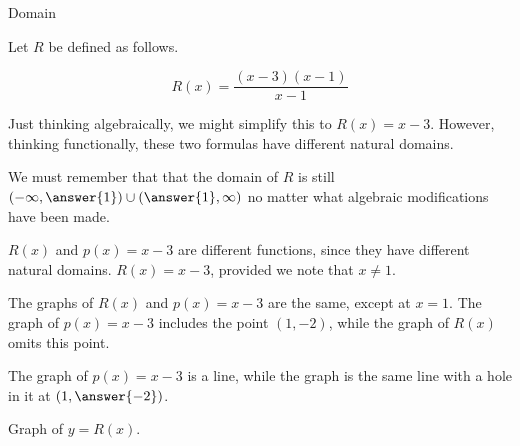 \documentclass{ximera}
\begin{document}
\begin{example} Domain

Let $R$ be defined as follows.


\[   R(x) = \frac{(x-3)(x-1)}{x-1}            \]


Just thinking algebraically, we might simplify this to $R(x) = x-3$. However, thinking functionally, these two formulas have different natural domains.


We must remember that that the domain of $R$ is still $\left( -\infty, \answer{1} \right) \cup \left( \answer{1},\infty \right)$ no matter what algebraic modifications have been made.

$R(x)$ and $p(x) = x-3$ are different functions, since they have different natural domains. $R(x) = x - 3$, provided we note that $x \ne 1$.


The graphs of $R(x)$ and $p(x) = x-3$ are the same, except at $x=1$.  The graph of $p(x) = x-3$ includes the point $(1, -2)$, while the graph of $R(x)$ omits this point.



The graph of $p(x) = x-3$ is a line, while the graph is the same line with a hole in it at $\left( 1, \answer{-2} \right)$.












Graph of $y = R(x)$.


\begin{image}
\end{image}
\end{example}
\end{document}
